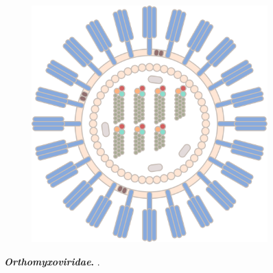 \begin{figure}
\begin{subfigure}[b]{0.475\textwidth}
        \includegraphics[width=\textwidth]{Graphics/Influenza_B.pdf}
    \end{subfigure}
    \caption[\textit{Orthomyxoviridae}]{\textbf{\textit{Orthomyxoviridae}.} .}
    \label{fig:Orthomyxoviridae}
\end{figure}

\blindtext

